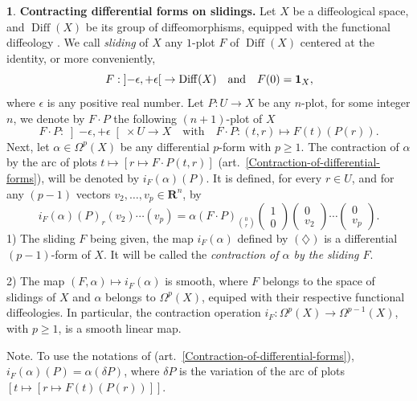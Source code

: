 \documentclass[11pt,reqno]{amsart}
\theoremstyle{definition}
\newtheorem{article}{}
\newcommand{\artlabel}[1]{{\bf #1.}}
\newcommand{\qmbox}[1]{\quad \mbox{#1}\quad}
\newcommand{\RR}{{\mathbf R}}
\def \F{{F}}
\def \P{{P}}
\def \U{{U}}
\def \X{{X}}
\newcommand{\art}[1]{{(art.~\ref{#1})}}
\newcommand{\Diff}{\operatorname{Diff}}
\newcommand{\openinterval}[1]{\left] #1 \right[}
\newcommand{\id}{{\bf 1}}
\begin{document}
  \begin{article}\artlabel{Contracting differential forms on slidings}
    \label{Contracting-differential-forms-on-sliding}
    Let
    $\X$ be a diffeological spa\-ce, and $\Diff(\X)$ be its
    group of diffeomorphisms, equipped with the functional
    diffeology \cite{Piz05}. We call {\em sliding} of $\X$
    any $1$-plot $\F$ of $\Diff(\X)$ centered at the identity, or more conveniently,
    $$
      \F : \openinterval{-\epsilon, +\epsilon} \to \Diff(\X) 
      \qmbox{and} \F(0) = \id_\X,
      $$
    where $\epsilon$ is any positive real number. Let $\P : \U \to \X$ be any $n$-plot,
    for some integer $n$, we denote by $\F \cdot \P$ the following $(n+1)$-plot of $\X$
    $$
      \F \cdot \P: \openinterval{-\epsilon, +\epsilon}
      \times \U \to \X \quad \mbox{with} \quad \F \cdot \P :
      (t,r) \mapsto \F(t)(\P(r)). 
      $$
    Next, let $\alpha \in \Omega^p(\X)$ be any differential $p$-form with $p\geq 1$.
    The contraction of $\alpha$ by the arc of plots $t
      \mapsto [r \mapsto \F \cdot \P(t,r)]$
    \art{Contraction-of-differential-forms}, will be denoted
    by $i_\F(\alpha)(\P)$. It is defined, for every $r \in \U$, 
    and for any $(p-1)$ vectors $v_2,\ldots,v_p \in \RR^n$, by
    \begin{equation}
      \renewcommand{\theequation}{$\diamondsuit$}
      i_\F(\alpha)(\P)_r(v_2) \cdots
      (v_{p}) =  \alpha(\F \cdot \P)_{0 \choose r}
      \begin{pmatrix}1 \\ 0\end{pmatrix} \begin{pmatrix}0 \\ v_2\end{pmatrix} \cdots
      \begin{pmatrix}0 \\ v_{p}\end{pmatrix}.
    \end{equation}
    1) The sliding $\F$ being given, the map $i_\F(\alpha)$ defined by 
    $(\diamondsuit)$ is a differential $(p-1)$-form of $\X$. 
    It will be called the {\em contraction of $\alpha$ by the sliding $\F$}.
    
    2) The map $(\F,\alpha) \mapsto i_\F(\alpha)$ is smooth, where $\F$ belongs to the
    space of slidings of $\X$ and $\alpha$ belongs to
    $\Omega^p(\X)$, equiped with their respective functional diffeologies. 
    In particular, the contraction operation $i_\F: \Omega^p(\X) \to
      \Omega^{p-1}(\X)$, with $p\geq 1$, is a smooth linear map.
        
    {\sc Note.} To use the notations of
    \art{Contraction-of-differential-forms},
    $i_\F(\alpha)(\P) = \alpha(\delta \P)$, where $\delta \P$
    is the variation of the arc of plots $[t \mapsto [r
      \mapsto \F(t)(\P(r))]]$.
  \end{article} %
  
\end{document}
